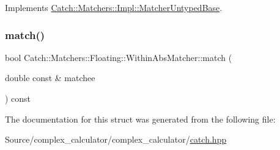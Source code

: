 Implements \mbox{\hyperlink{class_catch_1_1_matchers_1_1_impl_1_1_matcher_untyped_base_a91d3a907dbfcbb596077df24f6e11fe2}{Catch\+::\+Matchers\+::\+Impl\+::\+Matcher\+Untyped\+Base}}.

\mbox{\label{struct_catch_1_1_matchers_1_1_floating_1_1_within_abs_matcher_afa5d8eed57f12c1e5d006471eb0bfe72}} 
\subsubsection{\texorpdfstring{match()}{match()}}
{\footnotesize\ttfamily bool Catch\+::\+Matchers\+::\+Floating\+::\+Within\+Abs\+Matcher\+::match (\begin{DoxyParamCaption}\item[{double const \&}]{matchee }\end{DoxyParamCaption}) const\hspace{0.3cm}{\ttfamily [override]}}



The documentation for this struct was generated from the following file\+:\begin{DoxyCompactItemize}
\item 
Source/complex\+\_\+calculator/complex\+\_\+calculator/\mbox{\hyperlink{catch_8hpp}{catch.\+hpp}}\end{DoxyCompactItemize}
